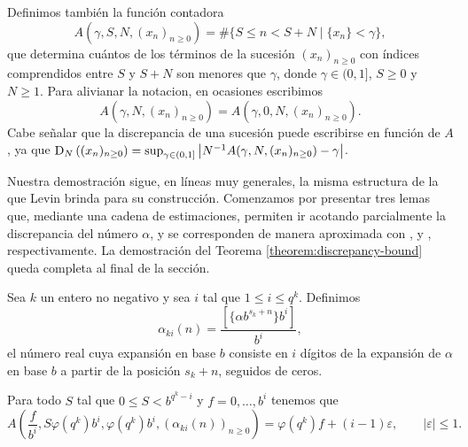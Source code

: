 Definimos también la función contadora
\[ A\left(\gamma, S, N, \left(x_n\right)_{n\geq0} \right)
	= \# \lbrace S \leq n < S + N \;\vert\; \lbrace x_n \rbrace < \gamma \rbrace, \]
que determina cuántos de los términos de la sucesión $\left(x_n\right)_{n\geq0}$
con índices comprendidos entre $S$ y $S+N$ son menores que $\gamma$, donde
$\gamma \in (0, 1]$, $S \geq 0$ y $N \geq 1$. Para alivianar la notacion,
en ocasiones escribimos
\[ A\left(\gamma, N, \left(x_n\right)_{n\geq0} \right)
	= A\left(\gamma, 0, N, \left(x_n\right)_{n\geq0} \right). \]
Cabe señalar que la discrepancia de una sucesión puede escribirse en función de
$A$, ya que $\operatorname{D}_{N}\left( (x_n)_{n \geq 0}\right)
= \sup_{\gamma \in (0,1]} \left\vert N^{-1} A(\gamma, N,
(x_n)_{n \geq 0}) - \gamma \right\vert$.

\medskip

Nuestra demostración sigue, en líneas muy generales, la misma estructura
de la que Levin brinda para su construcción. Comenzamos por presentar
tres lemas que, mediante una cadena de estimaciones, permiten ir acotando
parcialmente la discrepancia del número $\alpha$, y se corresponden de
manera aproximada con \cite[Lemma 5]{levin-discrepancy-estimate},
\cite[Corollary 1]{levin-discrepancy-estimate}
y \cite[Corollary 2]{levin-discrepancy-estimate}, respectivamente.
La demostración del Teorema \ref{theorem:discrepancy-bound} queda completa
al final de la sección.

\begin{lemma}
	\label{lemma:discrepancy-1}
	Sea $k$ un entero no negativo y sea $i$ tal que $1 \leq i \leq q^k$. Definimos
	\[ \alpha_{ki}(n) = \frac{[\lbrace \alpha b^{s_k + n} \rbrace b^i]}{b^i}, \]
	el número real cuya expansión en base $b$ consiste en $i$ dígitos de la
	expansión de $\alpha$ en base $b$ a partir de la posición $s_k + n$,
	seguidos de ceros.

	Para todo $S$ tal que $0 \leq S < b^{q^k-i}$ y
	$f = 0, \dots, b^i$ tenemos que
	\[
		A\left(\frac{f}{b^i}, S \varphi(q^k) b^i, \varphi(q^k) b^i,
			\left(\alpha_{ki}(n)\right)_{n\geq0} \right)
		= \varphi(q^k)f + (i - 1)\varepsilon,
			\qquad \vert\varepsilon\vert \leq 1.
	\]
\end{lemma}


